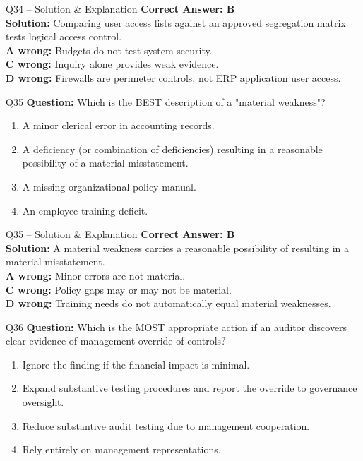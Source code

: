 \documentclass[aspectratio=169,10pt]{beamer}
\begin{document}
	\begin{frame}[t]{Q34 -- Solution \& Explanation}
		\small
		\textbf{Correct Answer: B} \\[4pt]
		\textbf{Solution:} Comparing user access lists against an approved segregation matrix tests logical access control. \\[4pt]
		\textbf{A wrong:} Budgets do not test system security. \\[2pt]
		\textbf{C wrong:} Inquiry alone provides weak evidence. \\[2pt]
		\textbf{D wrong:} Firewalls are perimeter controls, not ERP application user access.
	\end{frame}
	
	\begin{frame}[t]{Q35}
		\small
		\textbf{Question:} Which is the BEST description of a "material weakness"?
		\begin{enumerate}[label=\Alph*.,itemsep=1pt,topsep=2pt]
			\item A minor clerical error in accounting records.
			\item A deficiency (or combination of deficiencies) resulting in a reasonable possibility of a material misstatement.
			\item A missing organizational policy manual.
			\item An employee training deficit.
		\end{enumerate}
	\end{frame}
	
	\begin{frame}[t]{Q35 -- Solution \& Explanation}
		\small
		\textbf{Correct Answer: B} \\[4pt]
		\textbf{Solution:} A material weakness carries a reasonable possibility of resulting in a material misstatement. \\[4pt]
		\textbf{A wrong:} Minor errors are not material. \\[2pt]
		\textbf{C wrong:} Policy gaps may or may not be material. \\[2pt]
		\textbf{D wrong:} Training needs do not automatically equal material weaknesses.
	\end{frame}
	
	\begin{frame}[t]{Q36}
		\small
		\textbf{Question:} Which is the MOST appropriate action if an auditor discovers clear evidence of management override of controls?
		\begin{enumerate}[label=\Alph*.,itemsep=1pt,topsep=2pt]
			\item Ignore the finding if the financial impact is minimal.
			\item Expand substantive testing procedures and report the override to governance oversight.
			\item Reduce substantive audit testing due to management cooperation.
			\item Rely entirely on management representations.
		\end{enumerate}
	\end{frame}
	
\end{document}
